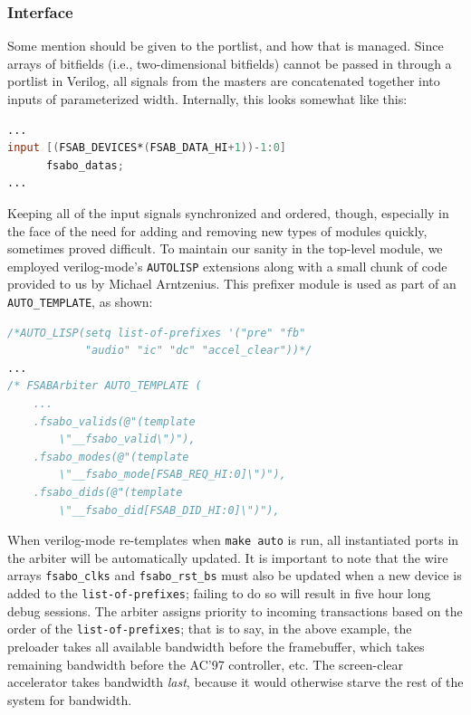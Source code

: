 \documentclass[10pt]{report}
\begin{document}
\subsubsection{Interface}

Some mention should be given to the portlist, and how that is managed. Since
arrays of bitfields (i.e., two-dimensional bitfields) cannot be passed in
through a portlist in Verilog, all signals from the masters are concatenated
together into inputs of parameterized width. Internally, this looks somewhat
like this:

\begin{lstlisting}[basicstyle=\footnotesize,language=Verilog]
...
input [(FSAB_DEVICES*(FSAB_DATA_HI+1))-1:0]
      fsabo_datas;
...
\end{lstlisting}


Keeping all of the input signals synchronized and ordered, though,
especially in the face of the need for adding and removing new types of
modules quickly, sometimes proved difficult. To maintain our sanity in the
top-level module, we employed verilog-mode's \texttt{AUTOLISP} extensions along with
a small chunk of code provided to us by Michael Arntzenius. This prefixer
module is used as part of an \texttt{AUTO\_TEMPLATE}, as shown:

\begin{lstlisting}[basicstyle=\footnotesize,language=Verilog]
/*AUTO_LISP(setq list-of-prefixes '("pre" "fb"
            "audio" "ic" "dc" "accel_clear"))*/
...
/* FSABArbiter AUTO_TEMPLATE (
    ...
    .fsabo_valids(@"(template
        \"__fsabo_valid\")"),
    .fsabo_modes(@"(template
        \"__fsabo_mode[FSAB_REQ_HI:0]\")"),
    .fsabo_dids(@"(template
        \"__fsabo_did[FSAB_DID_HI:0]\")"),
\end{lstlisting}

When verilog-mode re-templates when \texttt{make auto} is run, all
instantiated ports in the arbiter will be automatically updated.  It is
important to note that the wire arrays \texttt{fsabo\_clks} and
\texttt{fsabo\_rst\_bs} must also be updated when a new device is added to the
\texttt{list-of-prefixes}; failing to do so will result in five hour long
debug sessions.  The arbiter assigns priority to incoming transactions based
on the order of the \texttt{list-of-prefixes}; that is to say, in the above
example, the preloader takes all available bandwidth before the framebuffer,
which takes remaining bandwidth before the AC'97 controller, etc.  The
screen-clear accelerator takes bandwidth \textit{last}, because it would otherwise
starve the rest of the system for bandwidth.
\end{document}

